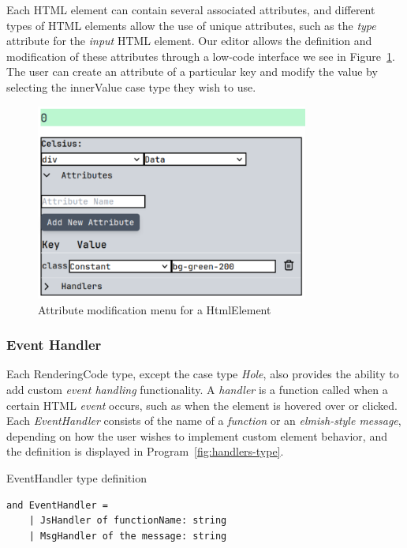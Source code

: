Each HTML element can contain several associated attributes, and different types of HTML elements allow the use of unique attributes, such as the \emph{type} attribute for the \emph{input} HTML element.
Our editor allows the definition and modification of these attributes through a low-code interface we see in Figure~\ref{fig:attrs-menu}.
The user can create an attribute of a particular key and modify the value by selecting the innerValue case type they wish to use.

\begin{figure}[htbp]
	\begin{center}
		\includegraphics[width=0.8\textwidth]{img/attribute-menu.pdf}
	\end{center}
	\caption{Attribute modification menu for a HtmlElement}\label{fig:attrs-menu}
\end{figure}

\subsubsection{Event Handler}
Each RenderingCode type, except the case type \emph{Hole}, also provides the ability to add custom \emph{event handling} functionality.
A \emph{handler} is a function called when a certain HTML \emph{event} occurs, such as when the element is hovered over or clicked.
Each \emph{EventHandler} consists of the name of a \emph{function} or an \emph{elmish-style message}, depending on how the user wishes to implement custom element behavior, and the definition is displayed in Program~\ref{fig:handlers-type}.

\begin{listing}[H]
	\caption{EventHandler type definition}
	\label{fig:handlers-type}
	\begin{lstlisting}
and EventHandler =
    | JsHandler of functionName: string
    | MsgHandler of the message: string
  \end{lstlisting}
\end{listing}

